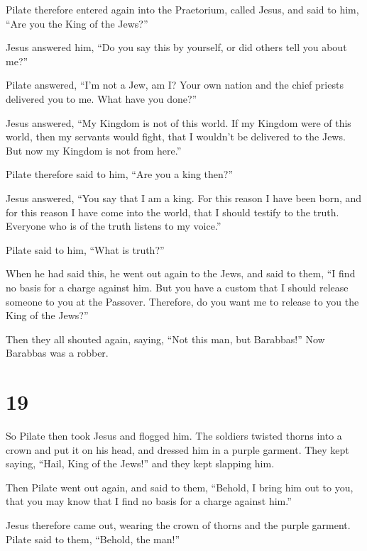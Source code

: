  Pilate therefore entered again into the Praetorium,
called Jesus, and said to him, ``Are you the King of the Jews?''

 Jesus answered him, ``Do you say this by yourself, or
did others tell you about me?''

 Pilate answered, ``I'm not a Jew, am I? Your own nation
and the chief priests delivered you to me. What have you done?''

 Jesus answered, ``My Kingdom is not of this world. If my
Kingdom were of this world, then my servants would fight, that I
wouldn't be delivered to the Jews. But now my Kingdom is not from
here.''

 Pilate therefore said to him, ``Are you a king then?''

Jesus answered, ``You say that I am a king. For this reason I have been
born, and for this reason I have come into the world, that I should
testify to the truth. Everyone who is of the truth listens to my
voice.''

 Pilate said to him, ``What is truth?''

When he had said this, he went out again to the Jews, and said to them,
``I find no basis for a charge against him.  But you have
a custom that I should release someone to you at the Passover.
Therefore, do you want me to release to you the King of the Jews?''

 Then they all shouted again, saying, ``Not this man, but
Barabbas!'' Now Barabbas was a robber.

\hypertarget{section-18}{%
\section{19}\label{section-18}}

 So Pilate then took Jesus and flogged him. 
The soldiers twisted thorns into a crown and put it on his head, and
dressed him in a purple garment.  They kept saying,
``Hail, King of the Jews!'' and they kept slapping him.

 Then Pilate went out again, and said to them, ``Behold, I
bring him out to you, that you may know that I find no basis for a
charge against him.''

 Jesus therefore came out, wearing the crown of thorns and
the purple garment. Pilate said to them, ``Behold, the man!''

